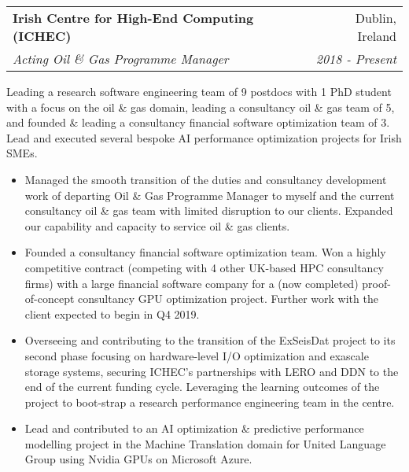 \documentclass[11pt]{article}
\makeatletter
\newenvironment{resumeSubSectionHeader}{
    \par
    \begin{tabular*}{\textwidth}{l@{\extracolsep{\fill}}r}
    \par
} {
    \end{tabular*}
    \par
}
\newenvironment{resumeSubSectionBody}{
    \par
    \vspace{-0.4\parskip}
    \begin{small}
    \par
} {
    \par
    \end{small}
    \par
}
\newenvironment{resumeItemize}{
    \vspace{-0.5\baselineskip}
    \begin{itemize}
} {
    \end{itemize}
}
\makeatother
\begin{document}
\begin{resumeSubSectionHeader}

    \textbf{Irish Centre for High-End Computing (ICHEC)} & Dublin, Ireland \\
    \emph{Acting Oil \& Gas Programme Manager} & \emph{2018 - Present}

\end{resumeSubSectionHeader}
\begin{resumeSubSectionBody}

    Leading a research software engineering team of 9 postdocs with 1 PhD
    student with a focus on the oil \& gas domain,
    leading a consultancy oil \& gas team of 5,
    and founded \& leading a consultancy financial software optimization team of
    3.
    Lead and executed several bespoke AI performance optimization projects for
    Irish SMEs.

    \begin{resumeItemize}
        \item
            Managed the smooth transition of the duties and consultancy
            development work of departing Oil \& Gas Programme Manager to myself
            and the current consultancy oil \& gas team with limited disruption
            to our clients. Expanded our capability and capacity to service oil
            \& gas clients.

        \item
            Founded a consultancy financial software optimization team. Won a
            highly competitive contract (competing with 4 other UK-based HPC
            consultancy firms) with a large financial software company for a
            (now completed) proof-of-concept consultancy GPU optimization
            project.
            Further work with the client expected to begin in Q4 2019.

        \item
            Overseeing and contributing to the transition of the ExSeisDat
            project to its second phase focusing on hardware-level I/O
            optimization and exascale storage systems, securing ICHEC's
            partnerships with LERO and DDN to the end of the current funding
            cycle.
            Leveraging the learning outcomes of the project to boot-strap a
            research performance engineering team in the centre.

        \item
            Lead and contributed to an AI optimization \& predictive
            performance modelling project in the Machine Translation domain for
            United Language Group using Nvidia GPUs on Microsoft Azure.


\end{resumeItemize}
\end{resumeSubSectionBody}
\end{document}
